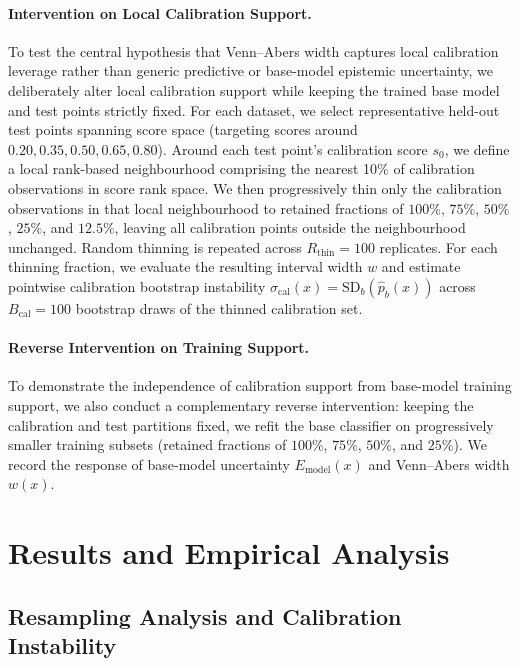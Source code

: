 \documentclass[11pt]{article}
\begin{document}
	\paragraph{Intervention on Local Calibration Support.}
	To test the central hypothesis that Venn--Abers width captures local calibration leverage rather than generic predictive or base-model epistemic uncertainty, we deliberately alter local calibration support while keeping the trained base model and test points strictly fixed. 
	For each dataset, we select representative held-out test points spanning score space (targeting scores around $0.20, 0.35, 0.50, 0.65, 0.80$). Around each test point's calibration score $s_0$, we define a local rank-based neighbourhood comprising the nearest 10\% of calibration observations in score rank space.
	We then progressively thin only the calibration observations in that local neighbourhood to retained fractions of $100\%$, $75\%$, $50\%$, $25\%$, and $12.5\%$, leaving all calibration points outside the neighbourhood unchanged. Random thinning is repeated across $R_{\mathrm{thin}} = 100$ replicates. For each thinning fraction, we evaluate the resulting interval width $w$ and estimate pointwise calibration bootstrap instability $\sigma_{\mathrm{cal}}(x) = \mathrm{SD}_b(\hat p_b(x))$ across $B_{\mathrm{cal}} = 100$ bootstrap draws of the thinned calibration set.

	\paragraph{Reverse Intervention on Training Support.}
	To demonstrate the independence of calibration support from base-model training support, we also conduct a complementary reverse intervention: keeping the calibration and test partitions fixed, we refit the base classifier on progressively smaller training subsets (retained fractions of $100\%$, $75\%$, $50\%$, and $25\%$). We record the response of base-model uncertainty $E_{\mathrm{model}}(x)$ and Venn--Abers width $w(x)$.

	\section{Results and Empirical Analysis}
	\label{sec:results}
	
	\subsection{Resampling Analysis and Calibration Instability}
	
\end{document}
